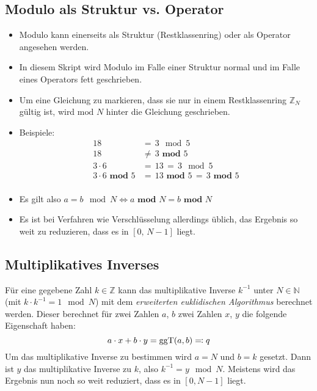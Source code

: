         \subsection{Modulo als Struktur vs. Operator}
            \begin{itemize}
            	\item Modulo kann einerseits als Struktur (Restklassenring) oder als Operator angesehen werden.
            	\item In diesem Skript wird Modulo im Falle einer Struktur normal und im Falle eines Operators fett geschrieben.
            	\item Um eine Gleichung zu markieren, dass sie nur in einem Restklassenring \( \mathbb{Z} _ N \) gültig ist, wird \(\text{mod } N \) hinter die Gleichung geschrieben.
            	\item Beispiele:
	            	\begin{align*}
		            	18 &=\, 3 \mod 5 \tag{Restklassenring} \\
		            	18 &\neq\, 3 \textbf{ mod } 5 \tag{Operator} \\
		            	3 \cdot 6 &=\, 13 \,=\, 3 \mod 5 \tag{Restklassenring} \\
		            	3 \cdot 6 \textbf{ mod } 5 &=\, 13 \textbf{ mod } 5 \,=\, 3 \textbf{ mod } 5 \tag{Operator} \\
	            	\end{align*}
	            \item Es gilt also \( a = b \mod N \iff a \textbf{ mod } N = b \textbf{ mod } N \)
	            \item Es ist bei Verfahren wie Verschlüsselung allerdings üblich, das Ergebnis so weit zu reduzieren, dass es in \( [0,\, N - 1] \) liegt.
            \end{itemize}
        
        \subsection{Multiplikatives Inverses}
            Für eine gegebene Zahl \(k \in \mathbb{Z} \) kann das multiplikative Inverse \( k^{-1} \) unter \(N \in \mathbb{N} \) (mit \( k \cdot k^{-1} = 1 \mod N \)) mit dem \textit{erweiterten euklidischen Algorithmus} berechnet werden. Dieser berechnet für zwei Zahlen \(a\), \(b\) zwei Zahlen \( x \), \( y \) die folgende Eigenschaft haben:
            \begin{equation*}
	            a \cdot x + b \cdot y = \textrm{ggT}(a, b) \eqqcolon q
            \end{equation*}
            Um das multiplikative Inverse zu bestimmen wird \( a = N \) und \( b = k \) gesetzt. Dann ist \(y\) das multiplikative Inverse zu \(k\), also \(k^{-1} = y \mod N \). Meistens wird das Ergebnis nun noch so weit reduziert, dass es in \( [0, N - 1] \) liegt.
            
